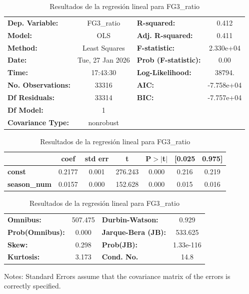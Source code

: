 \begin{table}[H]
\centering
\caption{Resultados de la regresión lineal para FG3\_ratio}
\label{tab:reg-fg3_ratio}
\begin{center}
\begin{tabular}{lclc}
\toprule
\textbf{Dep. Variable:}    &    FG3\_ratio    & \textbf{  R-squared:         } &     0.412   \\
\textbf{Model:}            &       OLS        & \textbf{  Adj. R-squared:    } &     0.411   \\
\textbf{Method:}           &  Least Squares   & \textbf{  F-statistic:       } & 2.330e+04   \\
\textbf{Date:}             & Tue, 27 Jan 2026 & \textbf{  Prob (F-statistic):} &     0.00    \\
\textbf{Time:}             &     17:43:30     & \textbf{  Log-Likelihood:    } &    38794.   \\
\textbf{No. Observations:} &       33316      & \textbf{  AIC:               } & -7.758e+04  \\
\textbf{Df Residuals:}     &       33314      & \textbf{  BIC:               } & -7.757e+04  \\
\textbf{Df Model:}         &           1      & \textbf{                     } &             \\
\textbf{Covariance Type:}  &    nonrobust     & \textbf{                     } &             \\
\bottomrule
\end{tabular}
\begin{tabular}{lcccccc}
                     & \textbf{coef} & \textbf{std err} & \textbf{t} & \textbf{P$> |$t$|$} & \textbf{[0.025} & \textbf{0.975]}  \\
\midrule
\textbf{const}       &       0.2177  &        0.001     &   276.243  &         0.000        &        0.216    &        0.219     \\
\textbf{season\_num} &       0.0157  &        0.000     &   152.628  &         0.000        &        0.015    &        0.016     \\
\bottomrule
\end{tabular}
\begin{tabular}{lclc}
\textbf{Omnibus:}       & 507.475 & \textbf{  Durbin-Watson:     } &     0.929  \\
\textbf{Prob(Omnibus):} &   0.000 & \textbf{  Jarque-Bera (JB):  } &   533.625  \\
\textbf{Skew:}          &   0.298 & \textbf{  Prob(JB):          } & 1.33e-116  \\
\textbf{Kurtosis:}      &   3.173 & \textbf{  Cond. No.          } &      14.8  \\
\bottomrule
\end{tabular}
\end{center}

Notes: \newline
 [1] Standard Errors assume that the covariance matrix of the errors is correctly specified.\end{table}
